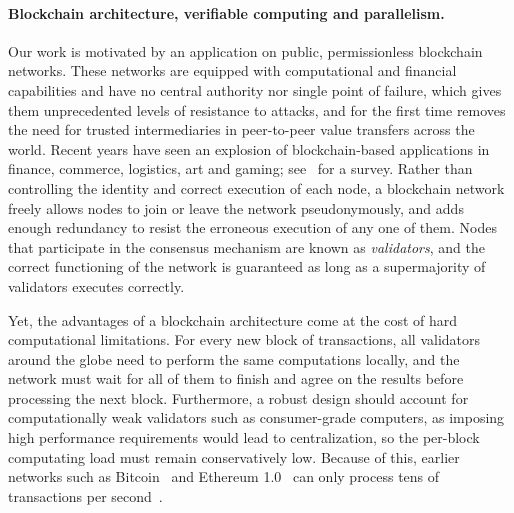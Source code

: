 \paragraph{Blockchain architecture, verifiable computing and parallelism.}
Our work is motivated by an application on public, permissionless blockchain networks. 
These networks are equipped with computational and financial capabilities and have no central authority nor single point of failure, which gives them unprecedented levels of resistance to attacks, and for the first time removes the need for trusted intermediaries in peer-to-peer value transfers across the world. Recent years have seen an explosion of blockchain-based applications in finance, commerce, logistics, art and gaming; see~\cite{maesa2020blockchain} for a survey. 
Rather than controlling the identity and correct execution of each node, a blockchain network freely allows nodes to join or leave the network pseudonymously, and adds enough redundancy to resist the erroneous execution of any one of them. 
Nodes that participate in the consensus mechanism are known as \emph{validators}, and the correct functioning of the network is guaranteed as long as a supermajority of validators executes correctly.

Yet, the advantages of a blockchain architecture come at the cost of hard computational limitations. For every new block of transactions, all validators around the globe need to perform the same computations locally, and the network must wait for all of them to finish and agree on the results before processing the next block. Furthermore, a robust design should account for computationally weak validators such as consumer-grade computers, as imposing high performance requirements would lead to centralization, so the per-block computating load must remain conservatively low. Because of this, earlier networks such as Bitcoin~\cite{nakamoto2019bitcoin} and Ethereum 1.0~\cite{wood2014ethereum} can only process tens of transactions per second~\cite{chauhan2018blockchain}. 

